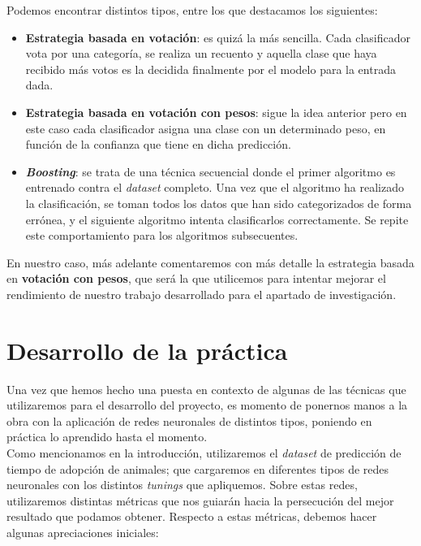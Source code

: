 \documentclass[]{article}
\begin{document}
			Podemos encontrar distintos tipos, entre los que destacamos los siguientes:
			
			\begin{itemize}
				\item \textbf{Estrategia basada en votación}: es quizá la más sencilla. Cada clasificador vota por una categoría, se realiza un recuento y aquella clase que haya recibido más votos es la decidida finalmente por el modelo para la entrada dada.
				\item \textbf{Estrategia basada en votación con pesos}: sigue la idea anterior pero en este caso cada clasificador asigna una clase con un determinado peso, en función de la confianza que tiene en dicha predicción.
				\item \textbf{\textit{Boosting}}: se trata de una técnica secuencial donde el primer algoritmo es entrenado contra el \textit{dataset} completo. Una vez que el algoritmo ha realizado la clasificación, se toman todos los datos que han sido categorizados de forma errónea, y el siguiente algoritmo intenta clasificarlos correctamente. Se repite este comportamiento para los algoritmos subsecuentes.
			\end{itemize}
		
			En nuestro caso, más adelante comentaremos con más detalle la estrategia basada en \textbf{votación con pesos}, que será la que utilicemos para intentar mejorar el rendimiento de nuestro trabajo desarrollado para el apartado de investigación.
		
\section{Desarrollo de la práctica}

	Una vez que hemos hecho una puesta en contexto de algunas de las técnicas que utilizaremos para el desarrollo del proyecto, es momento de ponernos manos a la obra con la aplicación de redes neuronales de distintos tipos, poniendo en práctica lo aprendido hasta el momento.\\
	
	Como mencionamos en la introducción, utilizaremos el \textit{dataset} de predicción de tiempo de adopción de animales; que cargaremos en diferentes tipos de redes neuronales con los distintos \textit{tunings} que apliquemos. Sobre estas redes, utilizaremos distintas métricas que nos guiarán hacia la persecución del mejor resultado que podamos obtener. Respecto a estas métricas, debemos hacer algunas apreciaciones iniciales:\\
	
\end{document}
